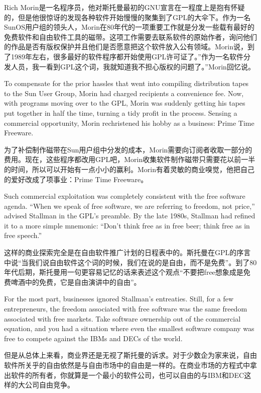 \ifdefined\chs
Rich Morin是一名程序员，他对斯托曼最初的GNU宣言在一程度上是抱有怀疑的，但是他很惊讶的发现各种软件开始慢慢的聚集到了GPL的大伞下。作为一名 SunOS用户组的领头人，Morin在80年代的一项重要工作就是分发一些载有最好的免费软件和自由软件工具的磁带。这项工作需要去联系软件的原始作者，询问他们的作品是否有版权保护并且他们是否愿意把这个软件放入公有领域。Morin说，到了1989年左右，很多最好的软件程序都开始使用GPL许可证了。”作为一名软件分发人员，我一看到GPL这个词，我就知道我不担心版权的问题了。”Morin回忆说。
\fi

\ifdefined\eng
To compensate for the prior hassles that went into compiling distribution tapes to the Sun User Group, Morin had charged recipients a convenience fee. Now, with programs moving over to the GPL, Morin was suddenly getting his tapes put together in half the time, turning a tidy profit in the process. Sensing a commercial opportunity, Morin rechristened his hobby as a business: Prime Time Freeware.
\fi

\ifdefined\chs
为了补偿制作磁带在Sun用户组中分发的成本，Morin需要向订阅者收取一部分的费用。现在，这些程序都改用GPL吧，Morin收集软件制作磁带只需要花以前一半的时间，所以可以开始有一点小小的赢利。Morin有着灵敏的商业嗅觉，他把自己的爱好改成了项事业：Prime Time Freeware。
\fi

\ifdefined\eng
Such commercial exploitation was completely consistent with the free software agenda. ``When we speak of free software, we are referring to freedom, not price,'' advised Stallman in the GPL's preamble. By the late 1980s, Stallman had refined it to a more simple mnemonic: ``Don't think free as in free beer; think free as in free speech.''
\fi

\ifdefined\chs
这样的商业探索完全是在自由软件推广计划的日程表中的。斯托曼在GPL的序言中说“当我们说自由软件这个词的时候，我们在说的是自由，而不是免费”。到了80年代后期，斯托曼用一句更容易记忆的话来表述这个观点“不要把free想象成是免费啤酒中的免费，它是自由演讲中的自由”。
\fi

\ifdefined\eng
For the most part, businesses ignored Stallman's entreaties. Still, for a few entrepreneurs, the freedom associated with free software was the same freedom associated with free markets. Take software ownership out of the commercial equation, and you had a situation where even the smallest software company was free to compete against the IBMs and DECs of the world.
\fi

\ifdefined\chs
但是从总体上来看，商业界还是无视了斯托曼的诉求。对于少数企为家来说，自由软件所关乎的自由依然是与自由市场中的自由是一样的。在商业市场的方程式中拿出软件的所有者，你就算是一个最小的软件公司，也可以自由的与IBM和DEC这样的大公司自由竞争。
\fi

